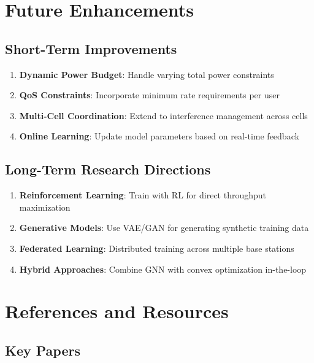 \documentclass[12pt,a4paper]{article}
\begin{document}
\section{Future Enhancements}

\subsection{Short-Term Improvements}

\begin{enumerate}
    \item \textbf{Dynamic Power Budget}: Handle varying total power constraints
    \item \textbf{QoS Constraints}: Incorporate minimum rate requirements per user
    \item \textbf{Multi-Cell Coordination}: Extend to interference management across cells
    \item \textbf{Online Learning}: Update model parameters based on real-time feedback
\end{enumerate}

\subsection{Long-Term Research Directions}

\begin{enumerate}
    \item \textbf{Reinforcement Learning}: Train with RL for direct throughput maximization
    \item \textbf{Generative Models}: Use VAE/GAN for generating synthetic training data
    \item \textbf{Federated Learning}: Distributed training across multiple base stations
    \item \textbf{Hybrid Approaches}: Combine GNN with convex optimization in-the-loop
\end{enumerate}

\section{References and Resources}

\subsection{Key Papers}
\end{document}
